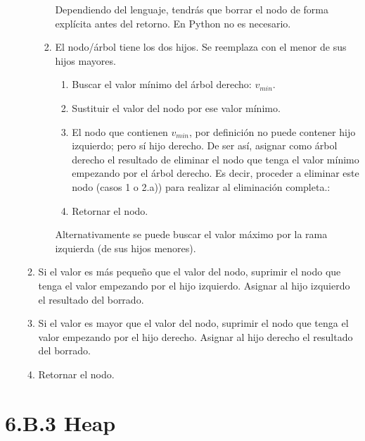 \begin{itemize}
\begin{enumerate}
\begin{enumerate}
		Dependiendo del lenguaje, tendrás que borrar el nodo de forma explícita antes del retorno.
		En Python no es necesario.
		
		\item El nodo/árbol tiene los dos hijos. Se reemplaza con el menor de sus hijos mayores.
			\begin{enumerate}
			\item Buscar el valor mínimo del árbol derecho: $v_{min}$.
			\item  Sustituir el valor del nodo por ese valor mínimo.
			\item El nodo que contienen $v_{min}$, por definición no puede contener hijo izquierdo; pero sí hijo derecho. De ser así, asignar como árbol derecho el resultado de eliminar el nodo que tenga el valor mínimo empezando por el árbol derecho. Es decir, proceder a eliminar este nodo (casos 1 o 2.a)) para realizar al eliminación completa.:
			
			
			\item Retornar el nodo.
			\end{enumerate}
			
			Alternativamente se puede buscar el valor máximo por la rama izquierda (de sus hijos menores).
		\end{enumerate}
	\item Si el valor es más pequeño que el valor del nodo, suprimir el nodo que tenga el valor empezando por el hijo izquierdo. Asignar al hijo izquierdo el resultado del borrado.
	\item Si el valor es mayor que el valor del nodo, suprimir el nodo que tenga el valor empezando por el hijo derecho. Asignar al hijo derecho el resultado del borrado.
	\item Retornar el nodo.
	\end{enumerate}
	
\end{itemize}






\section*{6.B.3 Heap}
\label{sec:HeapSort}

